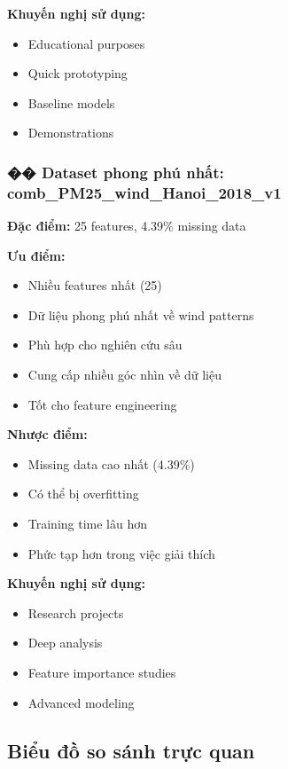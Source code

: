 \documentclass[12pt,a4paper]{article}
\begin{document}
\textbf{Khuyến nghị sử dụng:}
\begin{itemize}
    \item Educational purposes
    \item Quick prototyping
    \item Baseline models
    \item Demonstrations
\end{itemize}

\subsubsection{�� Dataset phong phú nhất: comb\_PM25\_wind\_Hanoi\_2018\_v1}

\textbf{Đặc điểm:} 25 features, 4.39\% missing data

\textbf{Ưu điểm:}
\begin{itemize}
    \item Nhiều features nhất (25)
    \item Dữ liệu phong phú nhất về wind patterns
    \item Phù hợp cho nghiên cứu sâu
    \item Cung cấp nhiều góc nhìn về dữ liệu
    \item Tốt cho feature engineering
\end{itemize}

\textbf{Nhược điểm:}
\begin{itemize}
    \item Missing data cao nhất (4.39\%)
    \item Có thể bị overfitting
    \item Training time lâu hơn
    \item Phức tạp hơn trong việc giải thích
\end{itemize}

\textbf{Khuyến nghị sử dụng:}
\begin{itemize}
    \item Research projects
    \item Deep analysis
    \item Feature importance studies
    \item Advanced modeling
\end{itemize}

\subsection{Biểu đồ so sánh trực quan}
\end{document}
